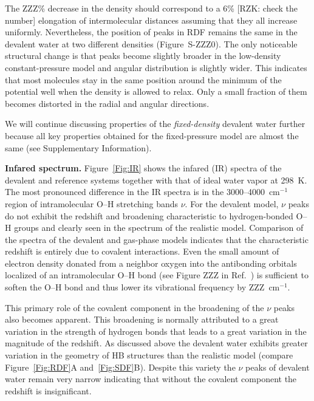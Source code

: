 \documentclass[aps,prl,reprint,amsmath,amssymb]{revtex4-1}
\begin{document}
The ZZZ\% decrease in the density should correspond to a 6\% [RZK: check the number] elongation of intermolecular distances assuming that they all increase uniformly. Nevertheless, the position of peaks in RDF remains the same in the devalent water at two different densities (Figure~S-ZZZ0). The only noticeable structural change is that peaks become slightly broader in the low-density constant-pressure model and angular distribution is slightly wider. This indicates that most molecules stay in the same position around the minimum of the potential well when the density is allowed to relax. Only a small fraction of them becomes distorted in the radial and angular directions. 

We will continue discussing properties of the \emph{fixed-density} devalent water further because all key properties obtained for the fixed-pressure model are almost the same (see Supplementary Information).


\textbf{Infared spectrum.} Figure~\ref{Fig:IR} shows the infared (IR) spectra of the devalent and reference systems together with that of ideal water vapor at 298~K. 
The most pronounced difference in the IR spectra is in the 3000--4000~cm$^{-1}$ region of intramolecular O--H stretching bands $\nu$. 
For the devalent model, $\nu$ peaks do not exhibit the redshift and broadening characteristic to hydrogen-bonded O--H groups and clearly seen in the spectrum of the realistic model. 
Comparison of the spectra of the devalent and gas-phase models indicates that the characteristic redshift is entirely due to covalent interactions. 
Even the small amount of electron density donated from a neighbor oxygen into the antibonding orbitals localized of an intramolecular O--H bond (see Figure ZZZ in Ref.~) is sufficient to soften the O--H bond and thus lower its vibrational frequency by ZZZ~cm$^{-1}$. 

This primary role of the covalent component in the broadening of the $\nu$ peaks also becomes apparent. 
This broadening is normally attributed to a great variation in the strength of hydrogen bonds that leads to a great variation in the magnitude of the redshift. 
As discussed above the devalent water exhibits greater variation in the geometry of HB structures than the realistic model (compare Figure~\ref{Fig:RDF}A and~\ref{Fig:SDF}B). 
Despite this variety the $\nu$ peaks of devalent water remain very narrow indicating that without the covalent component 
the redshift is insignificant. %
\end{document}
